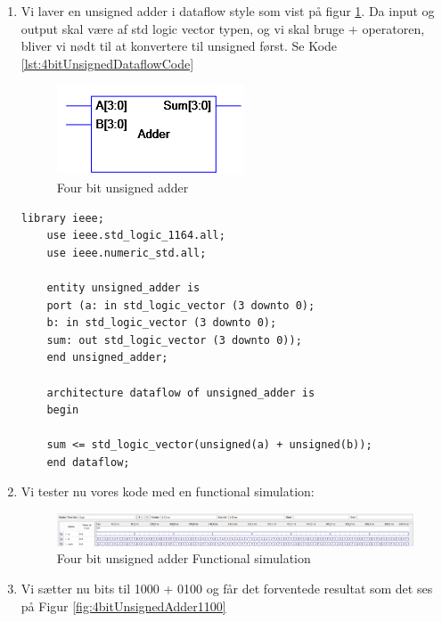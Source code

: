 \begin{enumerate}
	\item[1)]
	Vi laver en unsigned adder i dataflow style som vist på figur \ref{fig:4bitUnsignedAdder}. Da input og output skal være af std logic vector typen, og vi skal bruge + operatoren, bliver vi nødt til at konvertere til unsigned først. Se Kode \ref{lst:4bitUnsignedDataflowCode}\\
	
	\begin{figure}[H]
		\centering
		\includegraphics[scale=0.5]{pictures/Oevelse3/4bit_unsigned_adder.jpg}
		\caption{Four bit unsigned adder}
		\label{fig:4bitUnsignedAdder}
	\end{figure}
	
	\begin{lstlisting}[caption={Four bit unsigned adder Dataflow VHDL kode},label={lst:4bitUnsignedDataflowCode}]
	library ieee;
	use ieee.std_logic_1164.all;
	use ieee.numeric_std.all;
	
	entity unsigned_adder is
	port (a: in std_logic_vector (3 downto 0);
	b: in std_logic_vector (3 downto 0);
	sum: out std_logic_vector (3 downto 0));
	end unsigned_adder;
	
	architecture dataflow of unsigned_adder is
	begin
	
	sum <= std_logic_vector(unsigned(a) + unsigned(b));
	end dataflow;
	\end{lstlisting}
	
	\item[2)]
	Vi tester nu vores kode med en functional simulation:\\
	\begin{figure}[H]	
		\centering
		\includegraphics[scale=0.4]{pictures/Oevelse3/4bit_unsigned_adder_functional_simulation.jpeg}
		\caption{Four bit unsigned adder Functional simulation}
		\label{fig:4bitUnsignedAdderFuncSim}
	\end{figure}
\newpage
	\item[3)]
	Vi sætter nu bits til 1000 + 0100 og får det forventede resultat som det ses på Figur \ref{fig:4bitUnsignedAdder1100}\\
	\begin{figure}[H]
		

\end{figure}
\end{enumerate}
